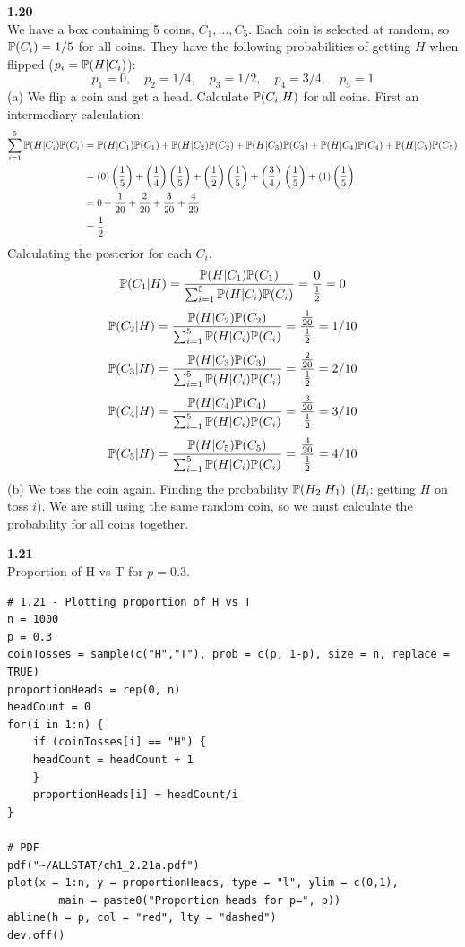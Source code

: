 \bigskip\noindent
\textbf{1.20}\\  %
We have a box containing 5 coins, $C_1,\ldots,C_5$. Each coin is selected at random, so $\P(C_i) = 1/5$ for all coins.
They have the following probabilities of
getting $H$ when flipped ($p_i = \P(H|C_i)$):
$$
p_1 = 0,\quad
p_2 = 1/4,\quad
p_3 = 1/2,\quad
p_4 = 3/4,\quad
p_5 = 1
$$
(a) We flip a coin and get a head. Calculate $\P(C_i|H)$ for all coins.
First an intermediary calculation:
\begin{align*}
    \sum_{i=1}^5 \P(H|C_i)\P(C_i) &= 
    \P(H|C_1)\P(C_1) + \P(H|C_2)\P(C_2) + \P(H|C_3)\P(C_3) + \P(H|C_4)\P(C_4) + \P(H|C_5)\P(C_5) \\
    &=
    \left(0\right)\left(\frac{1}{5}\right)
    + \left(\frac{1}{4}\right)\left(\frac{1}{5}\right)
    + \left(\frac{1}{2}\right)\left(\frac{1}{5}\right)
    + \left(\frac{3}{4}\right)\left(\frac{1}{5}\right)
    + \left(1\right)\left(\frac{1}{5}\right) \\
    &= 0 + \frac{1}{20} + \frac{2}{20} + \frac{3}{20} + \frac{4}{20} \\
    &= \frac{1}{2}
\end{align*}
Calculating the posterior for each $C_i$.
$$
\P(C_1|H) = 
\frac{\P(H|C_1)\P(C_1)}{\sum_{i=1}^5 \P(H|C_i)\P(C_i)}
= \frac{0}{\frac{1}{2}} = 0
$$
$$
\P(C_2|H) = 
\frac{\P(H|C_2)\P(C_2)}{\sum_{i=1}^5 \P(H|C_i)\P(C_i)}
= \frac{\frac{1}{20}}{\frac{1}{2}} = 1/10
$$
$$
\P(C_3|H) = 
\frac{\P(H|C_3)\P(C_3)}{\sum_{i=1}^5 \P(H|C_i)\P(C_i)}
= \frac{\frac{2}{20}}{\frac{1}{2}} = 2/10
$$
\newpage\noindent
$$
\P(C_4|H) = 
\frac{\P(H|C_4)\P(C_4)}{\sum_{i=1}^5 \P(H|C_i)\P(C_i)}
= \frac{\frac{3}{20}}{\frac{1}{2}} = 3/10
$$
$$
\P(C_5|H) = 
\frac{\P(H|C_5)\P(C_5)}{\sum_{i=1}^5 \P(H|C_i)\P(C_i)}
= \frac{\frac{4}{20}}{\frac{1}{2}} = 4/10
$$
(b) We toss the coin again. Finding the probability $\P(H_2|H_1)$ ($H_i$: getting $H$ on toss $i$).
We are still using the same random coin, so we must calculate the probability for all coins together.


\newpage\noindent
\textbf{1.21}\\  %
Proportion of H vs T for $p=0.3$.
\begin{lstlisting}[style=RSyntax, title=R]
# 1.21 - Plotting proportion of H vs T
n = 1000
p = 0.3
coinTosses = sample(c("H","T"), prob = c(p, 1-p), size = n, replace = TRUE)
proportionHeads = rep(0, n)
headCount = 0
for(i in 1:n) {
    if (coinTosses[i] == "H") {
    headCount = headCount + 1
    } 
    proportionHeads[i] = headCount/i
} 

# PDF
pdf("~/ALLSTAT/ch1_2.21a.pdf")
plot(x = 1:n, y = proportionHeads, type = "l", ylim = c(0,1),
        main = paste0("Proportion heads for p=", p))
abline(h = p, col = "red", lty = "dashed")
dev.off()         
\end{lstlisting}

